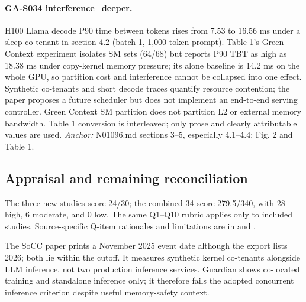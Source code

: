 \paragraph{GA-S034 interference\_deeper.} H100 Llama decode P90 time between tokens rises from 7.53 to 16.56 ms under a sleep co-tenant in section 4.2 (batch 1, 1,000-token prompt). Table 1's Green Context experiment isolates SM sets (64/68) but reports P90 TBT as high as 18.38 ms under copy-kernel memory pressure; its alone baseline is 14.2 ms on the whole GPU, so partition cost and interference cannot be collapsed into one effect. Synthetic co-tenants and short decode traces quantify resource contention; the paper proposes a future scheduler but does not implement an end-to-end serving controller. Green Context SM partition does not partition L2 or external memory bandwidth. Table 1 conversion is interleaved; only prose and clearly attributable values are used. \textit{Anchor:} N01096.md sections 3–5, especially 4.1–4.4; Fig. 2 and Table 1.

\subsection{Appraisal and remaining reconciliation}

The three new studies score 24/30; the combined 34 score 279.5/340, with 28 high, 6 moderate, and 0 low. The same Q1--Q10 rubric applies only to included studies. Source-specific Q-item rationales and limitations are in  and .

The SoCC paper prints a November 2025 event date although the export lists 2026; both lie within the cutoff. It measures synthetic kernel co-tenants alongside LLM inference, not two production inference services. Guardian shows co-located training and standalone inference only; it therefore fails the adopted concurrent inference criterion despite useful memory-safety context.

